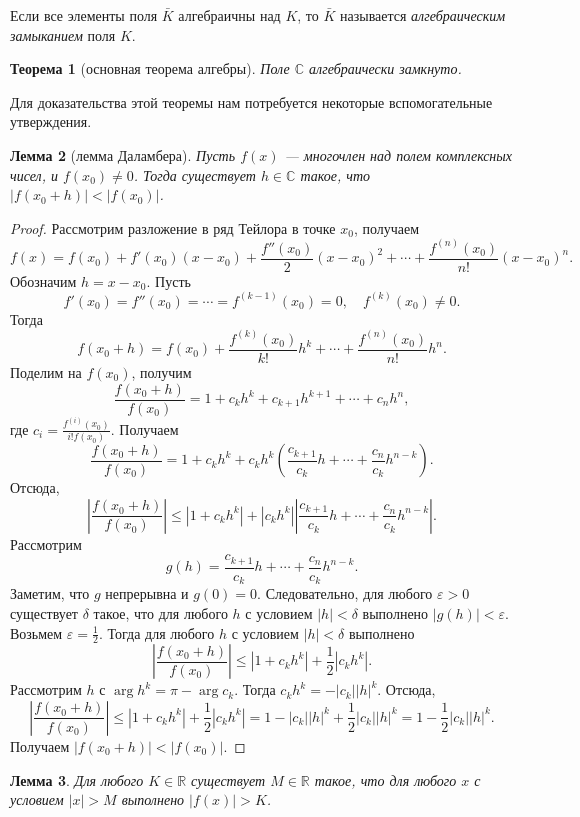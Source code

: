 \documentclass[12pt, titlepage, oneside]{amsbook}
\newcommand{\RR}{\mathbb{R}}
\newcommand{\CC}{\mathbb{C}}
\newtheorem{theorem}{Теорема}[chapter]
\newtheorem{lemma}[theorem]{Лемма}
\theoremstyle{definition}
\theoremstyle{remark}
\begin{document}
Если все элементы поля $\bar{K}$ алгебраичны над $K$, то $\bar{K}$ называется \emph{алгебраическим замыканием} поля $K$.

\begin{theorem}[основная теорема алгебры]
	\label{Mnog10} Поле $\CC$ алгебраически замкнуто.
\end{theorem}

Для доказательства этой теоремы нам потребуется некоторые вспомогательные утверждения.

\begin{lemma}[лемма Даламбера]
	\label{Dal}
	Пусть $f(x)$ --- многочлен над полем комплексных чисел, и $f(x_0)\neq 0$. Тогда существует $h\in \CC$ такое, что $|f(x_0+h)|<|f(x_0)|$.
\end{lemma}

\begin{proof}
	Рассмотрим разложение в ряд Тейлора в точке $x_0$, получаем $$f(x)=f(x_0)+f'(x_0)(x-x_0)+\frac{f''(x_0)}{2}(x-x_0)^2+\cdots+\frac{f^{(n)}(x_0)}{n!}(x-x_0)^n.$$ Обозначим $h=x-x_0$. Пусть $$f'(x_0)=f''(x_0)=\cdots=f^{(k-1)}(x_0)=0,\quad f^{(k)}(x_0)\neq 0.$$ Тогда $$f(x_0+h)=f(x_0)+\frac{f^{(k)}(x_0)}{k!}h^k+\cdots+\frac{f^{(n)}(x_0)}{n!}h^n.$$ Поделим на $f(x_0)$, получим $$\frac{f(x_0+h)}{f(x_0)}=1+c_kh^k+c_{k+1}h^{k+1}+\cdots+c_n h^n,$$ где $c_i=\frac{f^{(i)}(x_0)}{i!f(x_0)}$. Получаем $$\frac{f(x_0+h)}{f(x_0)}=1+c_kh^k+c_kh^k\left(\frac{c_{k+1}}{c_k}h+\cdots+\frac{c_{n}}{c_k}h^{n-k}\right).$$ Отсюда, $$\left|\frac{f(x_0+h)}{f(x_0)}\right|\leq|1+c_kh^k|+|c_kh^k|\left|\frac{c_{k+1}}{c_k}h+\cdots+\frac{c_{n}}{c_k}h^{n-k}\right|.$$ Рассмотрим $$g(h)=\frac{c_{k+1}}{c_k}h+\cdots+\frac{c_{n}}{c_k}h^{n-k}.$$ Заметим, что $g$ непрерывна и $g(0)=0$. Следовательно, для любого $\varepsilon>0$ существует $\delta$ такое, что для любого $h$ с условием $|h|<\delta$ выполнено $|g(h)|<\varepsilon$. Возьмем $\varepsilon=\frac{1}{2}$. Тогда для любого $h$ с условием $|h|<\delta$ выполнено $$\left|\frac{f(x_0+h)}{f(x_0)}\right|\leq|1+c_kh^k|+\frac{1}{2}|c_kh^k|.$$ Рассмотрим $h$ с $\arg h^k=\pi-\arg c_k$. Тогда $c_kh^k=-|c_k||h|^k$. Отсюда, $$\left|\frac{f(x_0+h)}{f(x_0)}\right|\leq|1+c_kh^k|+\frac{1}{2}|c_kh^k|=1-|c_k||h|^k+\frac{1}{2}|c_k||h|^k=1-\frac{1}{2}|c_k||h|^k.$$ Получаем $|f(x_0+h)|<|f(x_0)|$.
\end{proof}

\begin{lemma}
	\label{LemMnog1}
	Для любого $K\in\RR$ существует $M\in\RR$ такое, что для любого $x$ с условием $|x|>M$ выполнено $|f(x)|>K$.
\end{lemma}
\end{document}

